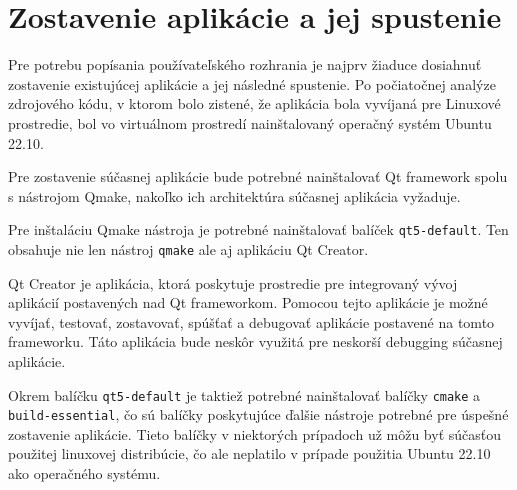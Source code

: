 \section {Zostavenie aplikácie a jej spustenie}
Pre potrebu popísania používateľského rozhrania je najprv žiaduce dosiahnuť zostavenie existujúcej aplikácie a jej následné spustenie. Po počiatočnej analýze zdrojového kódu, v ktorom bolo zistené, že aplikácia bola vyvíjaná pre Linuxové prostredie, bol vo virtuálnom prostredí nainštalovaný operačný systém Ubuntu 22.10.

Pre zostavenie súčasnej aplikácie bude potrebné nainštalovať Qt framework spolu s nástrojom Qmake, nakoľko ich architektúra súčasnej aplikácia vyžaduje.

Pre inštaláciu Qmake nástroja je potrebné nainštalovať balíček \texttt{qt5-default}. Ten obsahuje nie len nástroj \texttt{qmake} ale aj aplikáciu Qt Creator.

Qt Creator je aplikácia, ktorá poskytuje prostredie pre integrovaný vývoj aplikácií postavených nad Qt frameworkom. Pomocou tejto aplikácie je možné vyvíjať, testovať, zostavovať, spúšťať a debugovať aplikácie postavené na tomto frameworku. Táto aplikácia bude neskôr využitá pre neskorší debugging súčasnej aplikácie.

Okrem balíčku \texttt{qt5-default} je taktiež potrebné nainštalovať balíčky \texttt{cmake} a \texttt{build-essential}, čo sú balíčky poskytujúce ďalšie nástroje potrebné pre úspešné zostavenie aplikácie. Tieto balíčky v niektorých prípadoch už môžu byť súčasťou použitej linuxovej distribúcie, čo ale neplatilo v prípade použitia Ubuntu 22.10 ako operačného systému.

